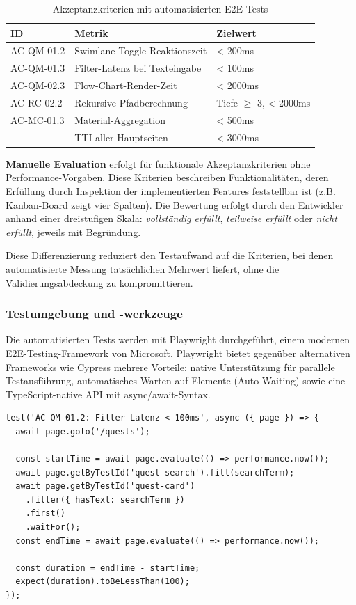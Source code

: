 \begin{table}[htbp]
\centering
\caption{Akzeptanzkriterien mit automatisierten E2E-Tests}
\label{tab:e2e-test-scope}
\begin{tabular}{llp{5cm}}
\toprule
\textbf{ID} & \textbf{Metrik} & \textbf{Zielwert} \\
\midrule
AC-QM-01.2 & Swimlane-Toggle-Reaktionszeit & < 200ms \\
AC-QM-01.3 & Filter-Latenz bei Texteingabe & < 100ms \\
AC-QM-02.3 & Flow-Chart-Render-Zeit & < 2000ms \\
AC-RC-02.2 & Rekursive Pfadberechnung & Tiefe $\geq$ 3, < 2000ms \\
AC-MC-01.3 & Material-Aggregation & < 500ms \\
\midrule
-- & \ac{TTI} aller Hauptseiten & < 3000ms \\
\bottomrule
\end{tabular}
\end{table}

\textbf{Manuelle Evaluation} erfolgt für funktionale Akzeptanzkriterien ohne Performance-Vorgaben. Diese Kriterien beschreiben Funktionalitäten, deren Erfüllung durch Inspektion der implementierten Features feststellbar ist (z.B. \glqq Kanban-Board zeigt vier Spalten\grqq{}). Die Bewertung erfolgt durch den Entwickler anhand einer dreistufigen Skala: \textit{vollständig erfüllt}, \textit{teilweise erfüllt} oder \textit{nicht erfüllt}, jeweils mit Begründung.

Diese Differenzierung reduziert den Testaufwand auf die Kriterien, bei denen automatisierte Messung tatsächlichen Mehrwert liefert, ohne die Validierungsabdeckung zu kompromittieren.

\subsubsection{Testumgebung und -werkzeuge}

Die automatisierten Tests werden mit Playwright durchgeführt, einem 
modernen E2E-Testing-Framework von Microsoft. Playwright bietet 
gegenüber alternativen Frameworks wie Cypress mehrere Vorteile: 
native Unterstützung für parallele Testausführung, automatisches 
Warten auf Elemente (Auto-Waiting) sowie eine TypeScript-native 
API mit async/await-Syntax.

\begin{lstlisting}[caption={Performance-Messung in Playwright}, label={lst:playwright-performance}]
test('AC-QM-01.2: Filter-Latenz < 100ms', async ({ page }) => {
  await page.goto('/quests');
  
  const startTime = await page.evaluate(() => performance.now());
  await page.getByTestId('quest-search').fill(searchTerm);
  await page.getByTestId('quest-card')
    .filter({ hasText: searchTerm })
    .first()
    .waitFor();
  const endTime = await page.evaluate(() => performance.now());
  
  const duration = endTime - startTime;
  expect(duration).toBeLessThan(100);
});
\end{lstlisting}

